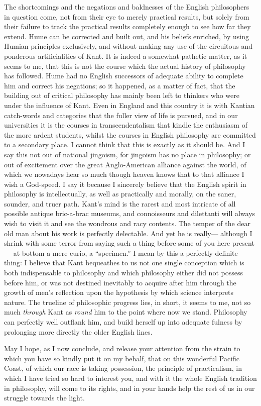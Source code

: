 \documentclass[12pt]{article}
\begin{document}
The shortcomings and the negations and baldnesses of the English philosophers in question come, not from their eye to merely practical results, but solely from their failure to track the practical results completely enough to see how far they extend. Hume can be corrected and built out, and his beliefs enriched, by using Humian principles exclusively, and without making any use of the circuitous and ponderous artificialities of Kant. It is indeed a somewhat pathetic matter, as it seems to me, that this is not the course which the actual history of philosophy has followed. Hume had no English successors of adequate ability to complete him and correct his negations; so it happened, as a matter of fact, that the building out of critical philosophy has mainly been left to thinkers who were under the influence of Kant. Even in England and this country it is with Kantian catch-words and categories that the fuller view of life is pursued, and in our universities it is the courses in transcendentalism that kindle the enthusiasm of the more ardent students, whilst the courses in English philosophy are committed to a secondary place. I cannot think that this is exactly as it should be. And I say this not out of national jingoism, for jingoism has no place in philosophy; or out of excitement over the great Anglo-American alliance against the world, of which we nowadays hear so much though heaven knows that to that alliance I wish a God-speed. I say it because I sincerely believe that the English spirit in philosophy is intellectually, as well as practically and morally, on the saner, sounder, and truer path. Kant's mind is the rarest and most intricate of all possible antique bric-a-brac museums, and connoisseurs and dilettanti will always wish to visit it and see the wondrous and racy contents. The temper of the dear old man about his work is perfectly delectable. And yet he is really--- although I shrink with some terror from saying such a thing before some of you here present--- at bottom a mere curio, a ``specimen.'' I mean by this a perfectly definite thing: I believe that Kant bequeathes to us not one single conception which is both indispensable to philosophy and which philosophy either did not possess before him, or was not destined inevitably to acquire after him through the growth of men's reflection upon the hypothesis by which science interprets nature. The trueline of philosophic progress lies, in short, it seems to me, not so much \emph{through} Kant as \emph{round} him to the point where now we stand. Philosophy can perfectly well outflank him, and build herself up into adequate fulness by prolonging more directly the older English lines. 

May I hope, as I now conclude, and release your attention from the strain to which you have so kindly put it on my behalf, that on this wonderful Pacific Coast, of which our race is taking possession, the principle of practicalism, in which I have tried so hard to interest you, and with it the whole English tradition in philosophy, will come to its rights, and in your hands help the rest of us in our struggle towards the light. 
\end{document}

